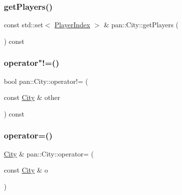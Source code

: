 \mbox{\label{classpan_1_1_city_af141a83daaa0521bbad892ba9c7fd6c3}} 
\subsubsection{\texorpdfstring{get\+Players()}{getPlayers()}}
{\footnotesize\ttfamily const std\+::set$<$ \hyperlink{namespacepan_a0cdabf874fbf1bb3a1f0152d108c2909}{Player\+Index} $>$ \& pan\+::\+City\+::get\+Players (\begin{DoxyParamCaption}{ }\end{DoxyParamCaption}) const\hspace{0.3cm}{\ttfamily [inline]}}

\mbox{\label{classpan_1_1_city_a5fefdda50088576ad882402a266fded8}} 
\subsubsection{\texorpdfstring{operator"!=()}{operator!=()}}
{\footnotesize\ttfamily bool pan\+::\+City\+::operator!= (\begin{DoxyParamCaption}\item[{const \hyperlink{classpan_1_1_city}{City} \&}]{other }\end{DoxyParamCaption}) const\hspace{0.3cm}{\ttfamily [inline]}}

\mbox{\label{classpan_1_1_city_af289409b1c1d687cc74b163dd15b4133}} 
\subsubsection{\texorpdfstring{operator=()}{operator=()}\hspace{0.1cm}{\footnotesize\ttfamily [1/2]}}
{\footnotesize\ttfamily \hyperlink{classpan_1_1_city}{City} \& pan\+::\+City\+::operator= (\begin{DoxyParamCaption}\item[{const \hyperlink{classpan_1_1_city}{City} \&}]{o }\end{DoxyParamCaption})}

